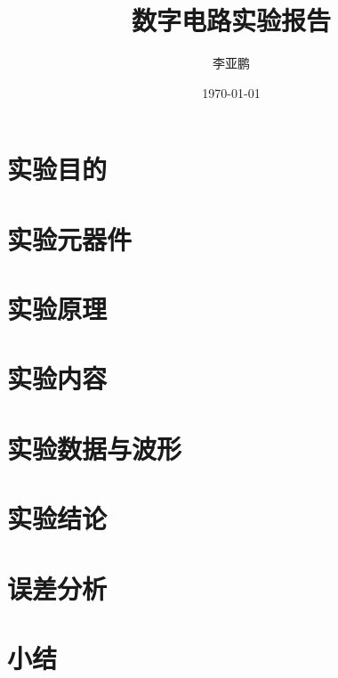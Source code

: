 \documentclass[UTF8]{ctexart}
\title{数字电路实验报告}
\author{李亚鹏}
\date{\today}
\begin{document}
\maketitle
\tableofcontents
\newpage
\section{实验目的} 
\section{实验元器件} 
\section{实验原理} 
\section{实验内容} 
\section{实验数据与波形} 
\section{实验结论} 
\section{误差分析} 
\section{小结} 
\end{document}
